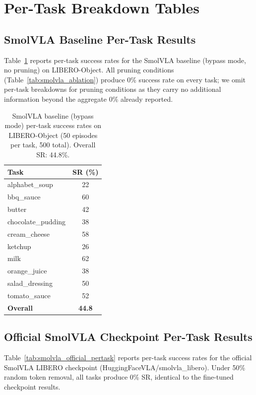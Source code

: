 \section{Per-Task Breakdown Tables}
\label{app:per_task}

\subsection{SmolVLA Baseline Per-Task Results}

Table~\ref{tab:smolvla_baseline_pertask} reports per-task success rates for the SmolVLA baseline (bypass mode, no pruning) on LIBERO-Object. All pruning conditions (Table~\ref{tab:smolvla_ablation}) produce 0\% success rate on every task; we omit per-task breakdowns for pruning conditions as they carry no additional information beyond the aggregate 0\% already reported.

\begin{table}[ht]
\centering
\small
\caption{SmolVLA baseline (bypass mode) per-task success rates on LIBERO-Object (50 episodes per task, 500 total). Overall SR: 44.8\%.}
\label{tab:smolvla_baseline_pertask}
\begin{tabular}{lc}
\toprule
Task & SR (\%) \\
\midrule
alphabet\_soup & 22 \\
bbq\_sauce & 60 \\
butter & 42 \\
chocolate\_pudding & 38 \\
cream\_cheese & 58 \\
ketchup & 26 \\
milk & 62 \\
orange\_juice & 38 \\
salad\_dressing & 50 \\
tomato\_sauce & 52 \\
\midrule
\textbf{Overall} & \textbf{44.8} \\
\bottomrule
\end{tabular}
\end{table}

\subsection{Official SmolVLA Checkpoint Per-Task Results}

Table~\ref{tab:smolvla_official_pertask} reports per-task success rates for the official SmolVLA LIBERO checkpoint (HuggingFaceVLA/smolvla\_libero). Under 50\% random token removal, all tasks produce 0\% SR, identical to the fine-tuned checkpoint results.

